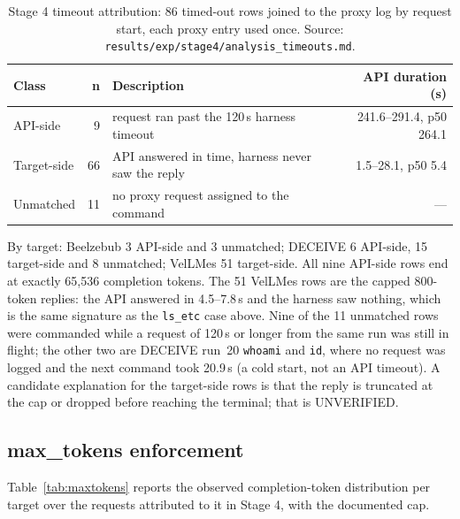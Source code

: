 \documentclass[a4paper,11pt]{article}
\begin{document}
\begin{table}[ht]
\centering
\caption{Stage 4 timeout attribution: 86 timed-out rows joined to the proxy log
by request start, each proxy entry used once. Source:
\texttt{results/exp/stage4/analysis\_timeouts.md}.}
\label{tab:timeouts}
\scriptsize
\begin{tabularx}{\textwidth}{l r Y r}
\toprule
Class & n & Description & API duration (s) \\
\midrule
API-side & 9 & request ran past the 120\,s harness timeout & 241.6--291.4, p50 264.1 \\
Target-side & 66 & API answered in time, harness never saw the reply & 1.5--28.1, p50 5.4 \\
Unmatched & 11 & no proxy request assigned to the command & --- \\
\bottomrule
\end{tabularx}
\end{table}

By target: Beelzebub 3 API-side and 3 unmatched; DECEIVE 6 API-side, 15
target-side and 8 unmatched; VelLMes 51 target-side. All nine API-side rows
end at exactly 65,536 completion tokens. The 51 VelLMes rows are the capped
800-token replies: the API answered in 4.5--7.8\,s and the harness saw nothing,
which is the same signature as the \texttt{ls\_etc} case above. Nine of the 11
unmatched rows were commanded while a request of 120\,s or longer from the same
run was still in flight; the other two are DECEIVE run~20 \texttt{whoami} and
\texttt{id}, where no request was logged and the next command took 20.9\,s (a
cold start, not an API timeout). A candidate explanation for the target-side
rows is that the reply is truncated at the cap or dropped before reaching the
terminal; that is UNVERIFIED.

\subsection{max\_tokens enforcement}
\label{sec:maxtokens}

Table~\ref{tab:maxtokens} reports the observed completion-token distribution
per target over the requests attributed to it in Stage 4, with the documented
cap.
\end{document}
